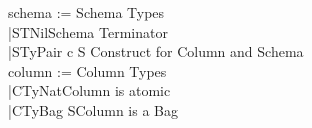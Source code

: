 \documentclass{article}
\begin{document}
\begin{frame}{}
\centering
	\begin{flushright}
	schema := \hfill \quad Schema Types\hfill \\
	\quad |STNil\hfill Schema Terminator\hfill \\
   	\quad |STyPair \:c \:S \hfill Construct \:for \:Column and Schema \hfill \\[3ex]
	column := \hfill \quad Column Types\hfill \\
	\quad |CTyNat\hfill Column is atomic\hfill \\
   	\quad |CTyBag \:S\hfill Column is a Bag\hfill \\

	\end{flushright}
\end{frame}
\end{document}
